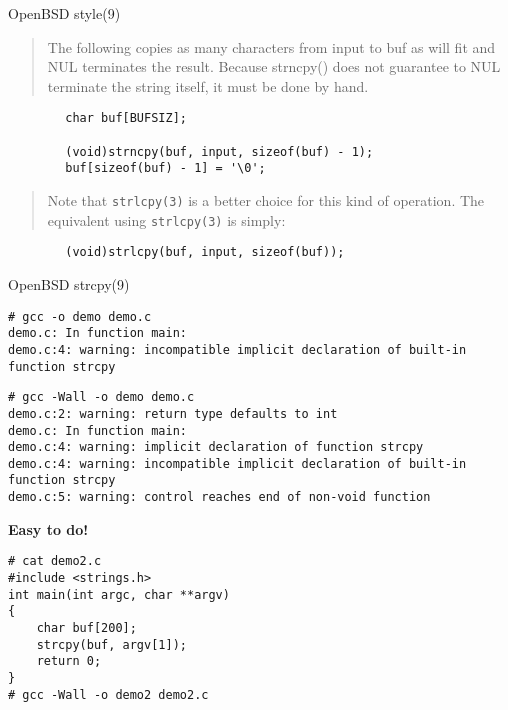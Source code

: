 \documentclass[Screen16to9,17pt]{foils}
\begin{document}
OpenBSD style(9)


\begin{quote}
The following copies as many characters from input to buf as will fit and
NUL terminates the result.  Because strncpy() does not guarantee to NUL
terminate the string itself, it must be done by hand.
\end{quote}

\begin{verbatim}
        char buf[BUFSIZ];

        (void)strncpy(buf, input, sizeof(buf) - 1);
        buf[sizeof(buf) - 1] = '\0';
\end{verbatim}

\begin{quote}
Note that \verb+strlcpy(3)+ is a better choice for this kind of operation.  The
equivalent using \verb+strlcpy(3)+ is simply:
\end{quote}
\begin{verbatim}
        (void)strlcpy(buf, input, sizeof(buf));
\end{verbatim}

OpenBSD strcpy(9)


\begin{verbatim}
# gcc -o demo demo.c
demo.c: In function main:
demo.c:4: warning: incompatible implicit declaration of built-in
function strcpy
\end{verbatim}

\begin{verbatim}
# gcc -Wall -o demo demo.c
demo.c:2: warning: return type defaults to int
demo.c: In function main:
demo.c:4: warning: implicit declaration of function strcpy
demo.c:4: warning: incompatible implicit declaration of built-in
function strcpy
demo.c:5: warning: control reaches end of non-void function
\end{verbatim}

\vskip 15mm
\centerline{\bf\LARGE\color{security6blue}Easy to do!}


\begin{verbatim}
# cat demo2.c
#include <strings.h>
int main(int argc, char **argv)
{
    char buf[200];
    strcpy(buf, argv[1]);
    return 0;
}
# gcc -Wall -o demo2 demo2.c
\end{verbatim}
\end{document}
